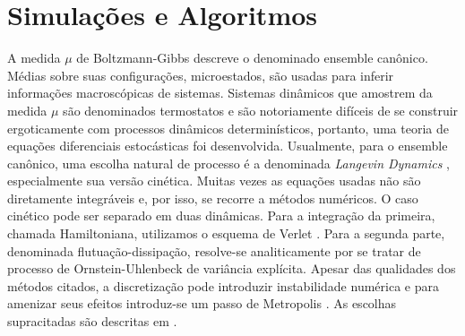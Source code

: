 \chapter{Simulações e Algoritmos}
\label{Capitulo: Simulações}

A medida $\mu$ de Boltzmann-Gibbs descreve o denominado ensemble canônico. Médias sobre suas configurações, microestados, são usadas para inferir informações macroscópicas de sistemas. Sistemas dinâmicos que amostrem da medida $\mu$ são denominados termostatos e são notoriamente difíceis de se construir ergoticamente com processos dinâmicos determinísticos, portanto, uma teoria de equações diferenciais estocásticas foi desenvolvida. Usualmente, para o ensemble canônico, uma escolha natural de processo é a denominada \textit{Langevin Dynamics} \cite[Capítulo~6]{leimmolecular}, especialmente sua versão cinética. Muitas vezes as equações usadas não são diretamente integráveis e, por isso, se recorre a métodos numéricos. O caso cinético pode ser separado em duas dinâmicas. Para a integração da primeira, chamada Hamiltoniana, utilizamos o esquema de Verlet \cite{Verlet}. Para a segunda parte, denominada flutuação-dissipação, resolve-se analiticamente por se tratar de processo de Ornstein-Uhlenbeck de variância explícita. Apesar das qualidades dos métodos citados, a discretização pode introduzir instabilidade numérica e para amenizar seus efeitos introduz-se um passo de Metropolis \cite[Apêndice~C]{leimmolecular}. As escolhas supracitadas são descritas em \cite{Chafa2018}.



